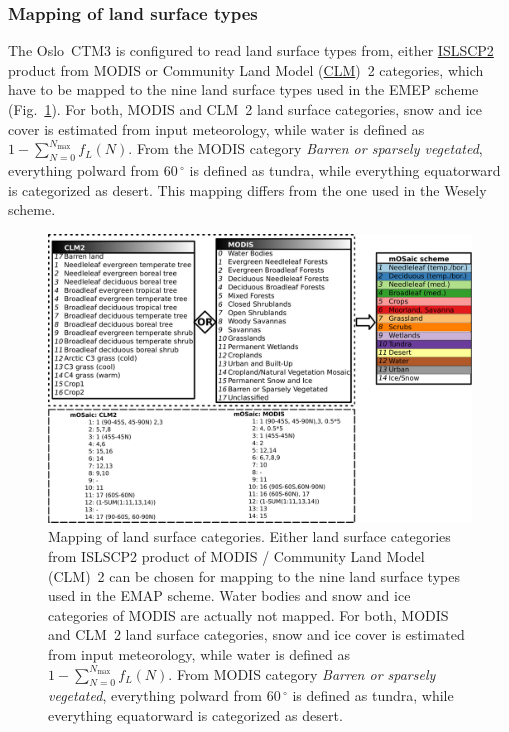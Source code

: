\documentclass[gmd, manuscript]{copernicus}
\begin{document}
\subsubsection{Mapping of land surface types}
The Oslo~CTM3 is configured to read land surface types from, either \href{https://daac.ornl.gov/cgi-bin/dataset_lister.pl?p=29}{ISLSCP2} product from MODIS or Community Land Model (\href{http://www.cgd.ucar.edu/tss/clm/}{CLM})~2 categories, which have to be mapped to the nine land surface types used in the EMEP scheme (Fig.~\ref{fig:pft_mapping}). For both, MODIS and CLM~2 land surface categories, snow and ice cover is estimated from input meteorology, while water is defined as $1-\sum_{N=0}^{N_\text{max}} f_L(N)$. From the MODIS category \emph{Barren or sparsely vegetated}, everything polward from $60\,\unit{^\circ}$ is defined as tundra, while everything equatorward is categorized as desert. This mapping differs from the one used in the Wesely scheme.

\begin{figure}[t]
  \includegraphics[width=12cm]{fig02}
  \caption{Mapping of land surface categories. Either land surface categories from ISLSCP2 product of MODIS /  Community Land Model (CLM)~2 can be chosen for mapping to the nine land surface types used in the EMAP scheme. Water bodies and snow and ice categories of MODIS are actually not mapped. For both, MODIS and CLM~2 land surface categories, snow and ice cover is estimated from input meteorology, while water is defined as $1-\sum_{N=0}^{N_\text{max}} f_L(N)$. From MODIS category \emph{Barren or sparsely vegetated}, everything polward from $60\,\unit{^\circ}$ is defined as tundra, while everything equatorward is categorized as desert.}
  \label{fig:pft_mapping}
\end{figure}
%
\end{document}
